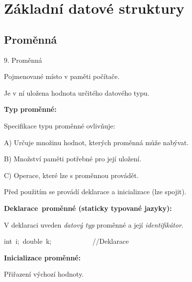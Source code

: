 \documentclass[czech]{beamer}
\newenvironment{lyxcode}
  {\par\begin{list}{}{
    \setlength{\rightmargin}{\leftmargin}
    \setlength{\listparindent}{0pt}%
    \raggedright
    \setlength{\itemsep}{0pt}
    \setlength{\parsep}{0pt}
    \normalfont\ttfamily}%
   \def\{{\char`\{}
   \def\}{\char`\}}
   \def\textasciitilde{\char`\~}
   \item[]}
  {\end{list}}
\begin{document}
\section{Základní datové struktury}

\subsection{Proměnná}
\begin{frame}[plain]{9. Proměnná}

{\tiny Pojmenované místo v paměti počítače. }{\tiny\par}

{\tiny Je v ní uložena hodnota určitého datového typu.\medskip{}
}{\tiny\par}

{\tiny\textbf{Typ proměnné:}}{\tiny\par}

{\tiny Specifikace typu proměnné ovlivňuje:\medskip{}
}{\tiny\par}

{\tiny A) Určuje množinu hodnot, kterých proměnná může nabývat.}{\tiny\par}

{\tiny B) Množství paměti potřebné pro její uložení.}{\tiny\par}

{\tiny C) Operace, které lze s proměnnou provádět.}{\tiny\par}

{\tiny\medskip{}
}{\tiny\par}

{\tiny Před použitím se provádí deklarace a inicializace (lze spojit).}{\tiny\par}

{\tiny\medskip{}
}{\tiny\par}

{\tiny\textbf{Deklarace~proměnné (staticky typované jazyky):}}{\tiny\par}

{\tiny V deklaraci uveden }{\tiny\emph{datový typ}}{\tiny{} proměnné
a její }{\tiny\emph{identifikátor}}{\tiny .}{\tiny\par}
\begin{lyxcode}
{\tiny int~i;~double~k;~~~~~~~~~~~~//Deklarace}{\tiny\par}
\end{lyxcode}
{\tiny\textbf{Inicializace proměnné:}}{\tiny\par}

{\tiny Přiřazení výchozí hodnoty.}{\tiny\par}


\end{frame}
\end{document}
